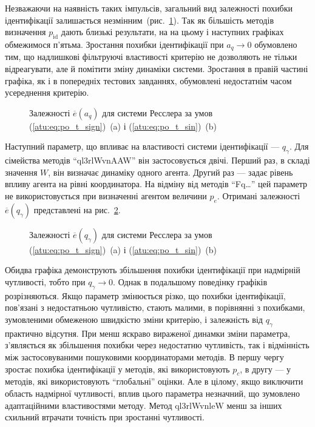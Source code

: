 Незважаючи на наявність таких імпульсів, загальний
вид залежності похибки ідентифікації залишається
незмінним~(рис.~\ref{atu:f:ross_e_a_q}).
Так як більшість методів визначення
$p_\mathrm{id} $ дають близькі результати, на на цьому і наступних
графіках обмежимося п'ятьма. Зростання похибки ідентифікації
при
$a_q \to 0 $ обумовлено тим, що надлишкові фільтруючі властивості
критерію не дозволяють не тільки відреагувати, але й помітити
зміну динаміки системи. Зростання в правій частині графіка,
як і в попередніх тестових завданнях, обумовлені недостатнім
часом усереднення критерію.

\begin{figure}[htb!]
  \caption{Залежності $ \overline{e} (a_q) $ для системи Ресслера за умов (\ref{atu:eq:po_t_sign})~(a) і (\ref{atu:eq:po_t_sin})~(b)}
\label{atu:f:ross_e_a_q}
\end{figure}

Наступний параметр, що впливає на властивості системи
ідентифікації ---
$ q_\gamma $. Для сімейства методів ``ql3rlWvnAAW'' він застосовується
двічі. Перший раз, в складі значення
$W$, він визначає динаміку одного агента. Другий раз --- задає
рівень впливу агента на рівні координатора. На відміну від
методів ``Fq\ldots'' цей параметр не використовується при визначенні агентом
величини $p_e$. Отримані залежності
$\overline{e}(q_\gamma) $ представлені на рис.~\ref{atu:f:ross_e_q_gamma}.

\begin{figure}[htb!]
\caption{Залежності $\overline{e}(q_\gamma) $ для системи Ресслера за умов (\ref{atu:eq:po_t_sign})~(a) і (\ref{atu:eq:po_t_sin})~(b)}
\label{atu:f:ross_e_q_gamma}
\end{figure}

Обидва графіка демонструють збільшення похибки ідентифікації
при надмірній чутливості, тобто при
$ q_\gamma \to 0 $. Однак в подальшому поведінку графіків
розрізняються. Якщо параметр змінюється різко, що похибки
ідентифікації, пов'язані з недостатньою чутливістю, стають
малими, в порівнянні з похибками, зумовленими обмеженою
швидкістю зміни критерію, і залежність від
$ q_\gamma $ практично відсутня. При менш яскраво вираженої динамки
зміни параметра, з'являється як збільшення похибки через
недостатню чутливість, так і відмінність між застосовуваними
пошуковими координаторами методів. В першу чергу зростає
похибка ідентифікації у методів, які використовують
$p_c$, в другу --- у методів, які використовують ``глобальні'' оцінки.
Але в цілому, якщо виключити область надмірної
чутливості, вплив цього параметра незначний, що зумовлено
адаптаційними властивостями методу. Метод ql3rlWvnleW менш за інших
схильний втрачати точність при зростанні чутливості.

